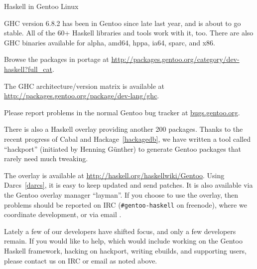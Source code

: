 \begin{hcarentry}{Haskell in Gentoo Linux}
\label{gentoo}
\makeheader

GHC version 6.8.2 has been in Gentoo since late last year, and is about to
go stable. All of the 60+ Haskell libraries and tools work with it, too. 
There are also GHC binaries available for alpha, amd64, hppa, ia64, sparc,
and x86.

Browse the packages in portage at 
\url{http://packages.gentoo.org/category/dev-haskell?full\_cat}.

The GHC architecture/version matrix is available at
\url{http://packages.gentoo.org/package/dev-lang/ghc}.

Please report problems in the normal Gentoo bug tracker
at \url{bugs.gentoo.org}.

There is also a Haskell overlay providing another 200 packages. Thanks to
the recent progress of Cabal and Hackage~\cref{hackagedb}, we have written a tool called
``hackport'' (initiated by Henning G\"unther) to generate Gentoo packages
that rarely need much tweaking.

The overlay is available at
\url{http://haskell.org/haskellwiki/Gentoo}. Using
Darcs~\cref{darcs}, it is easy to keep updated and send patches.
It is also available via the Gentoo overlay manager ``layman''.
If you choose to use the overlay, then problems should be
reported on
IRC (\verb+#gentoo-haskell+ on freenode), where we coordinate
development, or via email .

Lately a few of our developers have shifted focus, and only a few
developers remain. If you would like to help, which would include
working on the Gentoo Haskell framework, hacking on hackport, writing
ebuilds, and supporting users, please contact us on IRC or email as noted
above.
\end{hcarentry}
